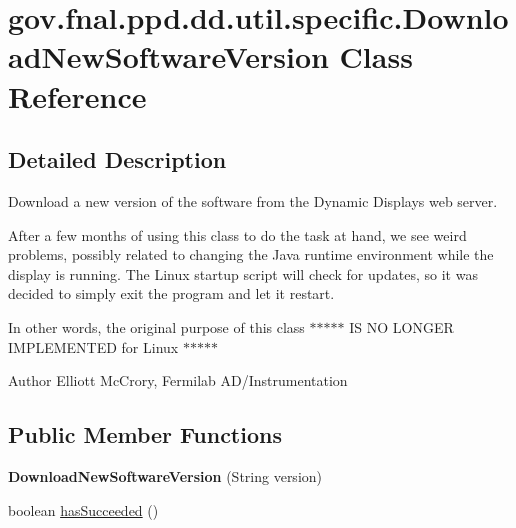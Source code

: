 \hypertarget{classgov_1_1fnal_1_1ppd_1_1dd_1_1util_1_1specific_1_1DownloadNewSoftwareVersion}{\section{gov.\-fnal.\-ppd.\-dd.\-util.\-specific.\-Download\-New\-Software\-Version Class Reference}
\label{classgov_1_1fnal_1_1ppd_1_1dd_1_1util_1_1specific_1_1DownloadNewSoftwareVersion}
}


\subsection{Detailed Description}
Download a new version of the software from the Dynamic Displays web server.

After a few months of using this class to do the task at hand, we see weird problems, possibly related to changing the Java runtime environment while the display is running. The Linux startup script will check for updates, so it was decided to simply exit the program and let it restart.

In other words, the original purpose of this class $\ast$$\ast$$\ast$$\ast$$\ast$ I\-S N\-O L\-O\-N\-G\-E\-R I\-M\-P\-L\-E\-M\-E\-N\-T\-E\-D for Linux $\ast$$\ast$$\ast$$\ast$$\ast$

\begin{DoxyAuthor}{Author}
Elliott Mc\-Crory, Fermilab A\-D/\-Instrumentation 
\end{DoxyAuthor}
\subsection*{Public Member Functions}
\begin{DoxyCompactItemize}
\item 
\hypertarget{classgov_1_1fnal_1_1ppd_1_1dd_1_1util_1_1specific_1_1DownloadNewSoftwareVersion_aed7d60f60522451adf764990637ae1ef}{{\bfseries Download\-New\-Software\-Version} (String version)}\label{classgov_1_1fnal_1_1ppd_1_1dd_1_1util_1_1specific_1_1DownloadNewSoftwareVersion_aed7d60f60522451adf764990637ae1ef}

\item 
boolean \hyperlink{classgov_1_1fnal_1_1ppd_1_1dd_1_1util_1_1specific_1_1DownloadNewSoftwareVersion_af9bd5dfe829e6225143cf18f0609d11f}{has\-Succeeded} ()
\end{DoxyCompactItemize}
